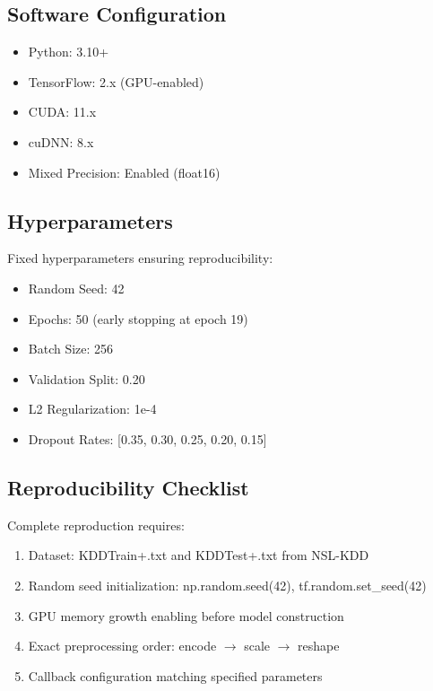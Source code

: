 \documentclass[12pt,a4paper]{report}
\begin{document}
\subsection{Software Configuration}

\begin{itemize}
    \item Python: 3.10+
    \item TensorFlow: 2.x (GPU-enabled)
    \item CUDA: 11.x
    \item cuDNN: 8.x
    \item Mixed Precision: Enabled (float16)
\end{itemize}

\subsection{Hyperparameters}

Fixed hyperparameters ensuring reproducibility:
\begin{itemize}
    \item Random Seed: 42
    \item Epochs: 50 (early stopping at epoch 19)
    \item Batch Size: 256
    \item Validation Split: 0.20
    \item L2 Regularization: 1e-4
    \item Dropout Rates: [0.35, 0.30, 0.25, 0.20, 0.15]
\end{itemize}

\subsection{Reproducibility Checklist}

Complete reproduction requires:
\begin{enumerate}
    \item Dataset: KDDTrain+.txt and KDDTest+.txt from NSL-KDD
    \item Random seed initialization: np.random.seed(42), tf.random.set\_seed(42)
    \item GPU memory growth enabling before model construction
    \item Exact preprocessing order: encode $\rightarrow$ scale $\rightarrow$ reshape
    \item Callback configuration matching specified parameters
\end{enumerate}
\end{document}
